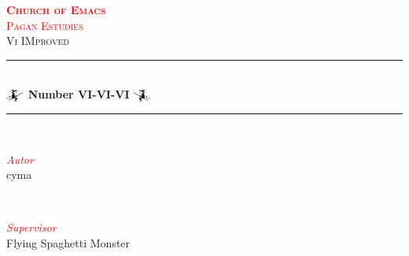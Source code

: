 \documentclass[a4paper,twoside,11pt]{article}
\begin{document}

\begin{titlepage}
 \newcommand{\HRule}{\rule{\linewidth}{0.5mm}}

	\center


    \textsc{\LARGE \bf\textcolor{red}{Church of Emacs}}\\[1.5cm] %

    \textsc{\Large \textcolor{red}{Pagan Estudies}}\\[0.5cm] %

	\textsc{\large Vi IMproved}\\[0.5cm] %


	\HRule\\[0.4cm]

    {\huge\bfseries $\mathwitch$ Number VI-VI-VI $\reversemathwitch$}\\[0.4cm] %

	\HRule\\[1.5cm]


	\begin{minipage}{0.4\textwidth}
		\begin{flushleft}
			\large
            \textit{\textcolor{red}{Autor}}\\
			cyma %
		\end{flushleft}
	\end{minipage}
	~
	\begin{minipage}{0.4\textwidth}
		\begin{flushright}
			\large
            \textit{\textcolor{red}{Supervisor}}\\
			Flying Spaghetti Monster%
		\end{flushright}
	\end{minipage}



\end{titlepage}
\end{document}
